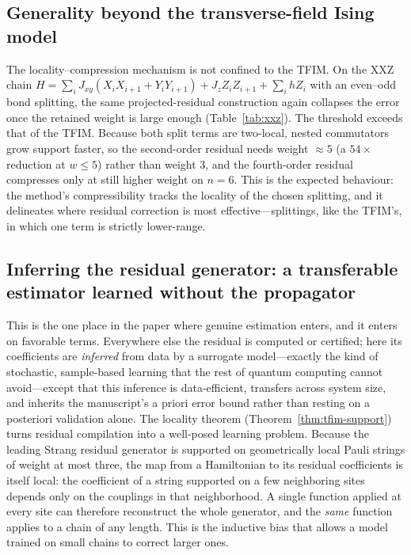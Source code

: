 \documentclass[aps,prxquantum,reprint,superscriptaddress,nofootinbib,amsmath,amssymb]{revtex4-2}
\newcommand{\tfim}{TFIM}
\begin{document}
\subsection{Generality beyond the transverse-field Ising model}
\label{sec:xxz}

The locality--compression mechanism is not confined to the \tfim{}. On the XXZ chain $H=\sum_i J_{xy}(X_iX_{i+1}+Y_iY_{i+1})+J_z Z_iZ_{i+1}+\sum_i hZ_i$ with an even--odd bond splitting, the same projected-residual construction again collapses the error once the retained weight is large enough (Table~\ref{tab:xxz}). The threshold exceeds that of the \tfim{}. Because both split terms are two-local, nested commutators grow support faster, so the second-order residual needs weight $\approx5$ (a $54\times$ reduction at $w\leq5$) rather than weight $3$, and the fourth-order residual compresses only at still higher weight on $n=6$. This is the expected behaviour: the method's compressibility tracks the locality of the chosen splitting, and it delineates where residual correction is most effective---splittings, like the \tfim{}'s, in which one term is strictly lower-range.



\subsection{Inferring the residual generator: a transferable estimator learned without the propagator}
\label{sec:learned}

This is the one place in the paper where genuine estimation enters, and it enters on favorable terms. Everywhere else the residual is computed or certified; here its coefficients are \emph{inferred} from data by a surrogate model---exactly the kind of stochastic, sample-based learning that the rest of quantum computing cannot avoid---except that this inference is data-efficient, transfers across system size, and inherits the manuscript's a priori error bound rather than resting on a posteriori validation alone. The locality theorem (Theorem~\ref{thm:tfim-support}) turns residual compilation into a well-posed learning problem. Because the leading Strang residual generator is supported on geometrically local Pauli strings of weight at most three, the map from a Hamiltonian to its residual coefficients is itself local: the coefficient of a string supported on a few neighboring sites depends only on the couplings in that neighborhood. A single function applied at every site can therefore reconstruct the whole generator, and the \emph{same} function applies to a chain of any length. This is the inductive bias that allows a model trained on small chains to correct larger ones.
\end{document}
